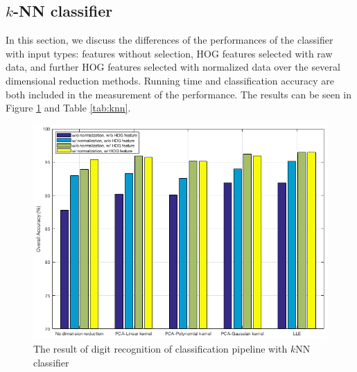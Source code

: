 \documentclass[12pt]{article}
\begin{document}
\subsection{$k$-NN classifier}
In this section, we discuss the differences of the performances of the classifier with input types: features without selection, HOG features selected with raw data, and further HOG features selected with normalized data over the several dimensional reduction methods. Running time and classification accuracy are both included in the measurement of the performance. The results can be seen in Figure \ref{fig:knn} and Table \ref{tab:knn}.

\begin{figure}[tbp]
	\centering
	\includegraphics[width =\textwidth]{knn}		
	\caption{The result of digit recognition of classification pipeline with $k$NN classifier}
	\label{fig:knn}
\end{figure}
\end{document}
